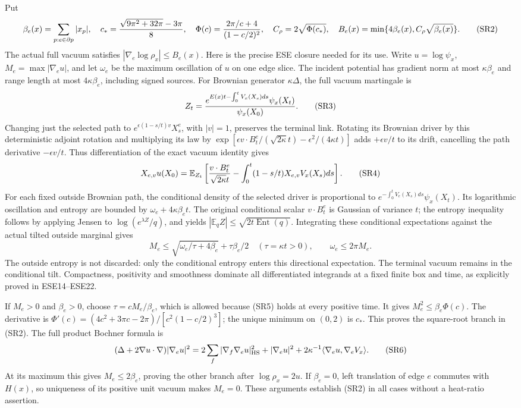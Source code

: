\documentclass[11pt]{article}
\begin{document}
Put
\[
\beta_e(x)=\sum_{p:e\in\partial p}|x_p|,\quad
c_*={\sqrt{9\pi^2+32\pi}-3\pi\over8},\quad
\Phi(c)={2\pi/c+4\over(1-c/2)^2},\quad
C_\rho=2\sqrt{\Phi(c_*)},\quad
B_e(x)=\min\{4\beta_e(x),C_\rho\sqrt{\beta_e(x)}\}.
\tag{SR2}
\]
The actual full vacuum satisfies \(|\nabla_e\log\rho_x|\le B_e(x)\). Here is the precise ESE closure needed for its use. Write \(u=\log\psi_x\), \(M_e=\max|\nabla_eu|\), and let \(\omega_e\) be the maximum oscillation of \(u\) on one edge slice. The incident potential has gradient norm at most \(\kappa\beta_e\) and range length at most \(4\kappa\beta_e\), including signed sources. For Brownian generator \(\kappa\Delta\), the full vacuum martingale is
\[
Z_t={e^{E(x)t-\int_0^tV_x(X_s)ds}\psi_x(X_t)\over\psi_x(X_0)}.
\tag{SR3}
\]
Changing just the selected path to \(e^{\epsilon(1-s/t)v}X_s^e\), with \(|v|=1\), preserves the terminal link. Rotating its Brownian driver by this deterministic adjoint rotation and multiplying its law by
\(\exp[\epsilon v\cdot B_t^e/(\sqrt{2\kappa}t)-\epsilon^2/(4\kappa t)]\)
adds \(+\epsilon v/t\) to its drift, cancelling the path derivative \(-\epsilon v/t\). Thus differentiation of the exact vacuum identity gives
\[
X_{e,v}u(X_0)=\mathbb E_{Z_t}\left[
{v\cdot B_t^e\over\sqrt{2\kappa}t}
-\int_0^t(1-s/t)X_{e,v}V_x(X_s)ds\right].
\tag{SR4}
\]
For each fixed outside Brownian path, the conditional density of the selected driver is proportional to
\(e^{-\int_0^t V_e(X_s)ds}\psi_x(X_t)\).
Its logarithmic oscillation and entropy are bounded by \(\omega_e+4\kappa\beta_et\). The original conditional scalar \(v\cdot B_t^e\) is Gaussian of variance \(t\); the entropy inequality follows by applying Jensen to \(\log(e^{\lambda Z}/q)\), and yields \(|\mathbb E_q Z|\le\sqrt{2t\operatorname{Ent}(q)}\). Integrating these conditional expectations against the actual tilted outside marginal gives
\[
M_e\le\sqrt{\omega_e/\tau+4\beta_e}+\tau\beta_e/2
\quad(\tau=\kappa t>0),\qquad \omega_e\le2\pi M_e.
\tag{SR5}
\]
The outside entropy is not discarded: only the conditional entropy enters this directional expectation. The terminal vacuum remains in the conditional tilt. Compactness, positivity and smoothness dominate all differentiated integrands at a fixed finite box and time, as explicitly proved in ESE14–ESE22.

If \(M_e>0\) and \(\beta_e>0\), choose \(\tau=cM_e/\beta_e\), which is allowed because (SR5) holds at every positive time. It gives \(M_e^2\le\beta_e\Phi(c)\). The derivative is
\(\Phi'(c)=(4c^2+3\pi c-2\pi)/[c^2(1-c/2)^3]\);
the unique minimum on \((0,2)\) is \(c_*\). This proves the square-root branch in (SR2). The full product Bochner formula is
\[
(\Delta+2\nabla u\cdot\nabla)|\nabla_eu|^2
=2\sum_f|\nabla_f\nabla_eu|_{\rm HS}^2+|\nabla_eu|^2
+2\kappa^{-1}\langle\nabla_eu,\nabla_eV_x\rangle.
\tag{SR6}
\]
At its maximum this gives \(M_e\le2\beta_e\), proving the other branch after \(\log\rho_x=2u\). If \(\beta_e=0\), left translation of edge \(e\) commutes with \(H(x)\), so uniqueness of its positive unit vacuum makes \(M_e=0\). These arguments establish (SR2) in all cases without a heat-ratio assertion.
\end{document}
